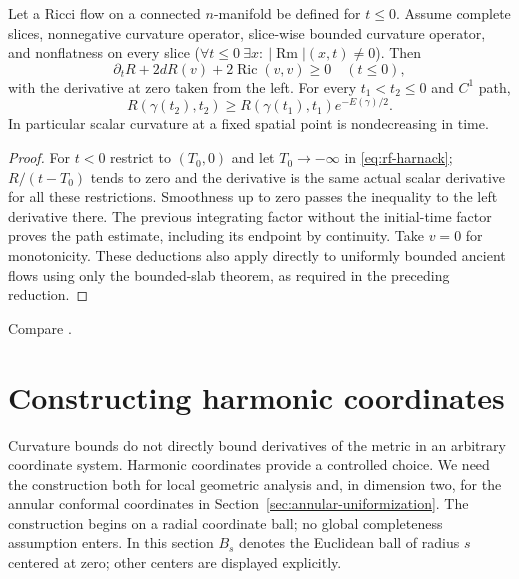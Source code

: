 \begin{corollary}\label{cor:rf-ancient-harnack}
Let a Ricci flow on a connected $n$-manifold be defined for $t\leq0$.
Assume complete slices, nonnegative curvature operator, slice-wise
bounded curvature operator, and nonflatness on every slice
($\forall t\leq0\ \exists x:\ |\operatorname{Rm}|(x,t)\ne0$).
Then
\[
 \partial_tR+2dR(v)+2\operatorname{Ric}(v,v)\geq0
 \quad(t\leq0),
\]
with the derivative at zero taken from the left.  For every
$t_1<t_2\leq0$ and $C^1$ path,
\[
 R(\gamma(t_2),t_2)\geq R(\gamma(t_1),t_1)e^{-E(\gamma)/2}.
\]
In particular scalar curvature at a fixed spatial point is
nondecreasing in time.
\end{corollary}
\begin{proof}
For $t<0$ restrict to $(T_0,0)$ and let $T_0\to-\infty$ in
\eqref{eq:rf-harnack}; $R/(t-T_0)$ tends to zero and the derivative is
the same actual scalar derivative for all these restrictions.
Smoothness up to zero passes the inequality to the left derivative
there.  The previous integrating factor without the initial-time
factor proves the path estimate, including its endpoint by continuity.
Take $v=0$ for monotonicity.  These deductions also apply directly to
uniformly bounded ancient flows using only the bounded-slab theorem,
as required in the preceding reduction.
\end{proof}
Compare \cite[Theorem 4.40, p.~82]{MT2007}.

\section{Constructing harmonic coordinates}
\label{sec:rf-harmonic-coordinates}

Curvature bounds do not directly bound derivatives of the metric in
an arbitrary coordinate system.  Harmonic coordinates provide a
controlled choice.  We need the construction both for local geometric
analysis and, in dimension two, for the annular conformal coordinates
in Section~\ref{sec:annular-uniformization}.  The construction begins
on a radial coordinate ball; no global completeness assumption enters.
In this section $B_s$ denotes the Euclidean ball of radius $s$
centered at zero; other centers are displayed explicitly.

